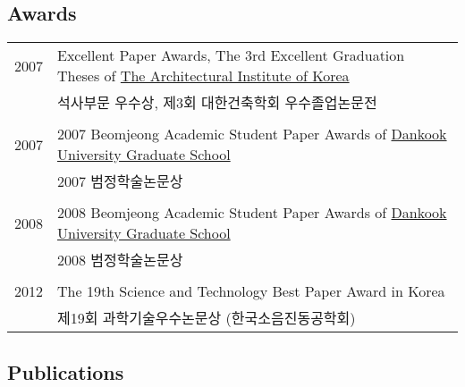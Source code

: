 \subsection*{Awards}

\begin{tabularx}{\textwidth}{p{}X}
    2007 & Excellent Paper Awards, The 3rd Excellent Graduation Theses of \href{http://www.aik.or.kr}{The Architectural Institute of Korea} \\
    & 석사부문 우수상, 제3회 대한건축학회 우수졸업논문전 \\
    \\
    2007 & 2007 Beomjeong Academic Student Paper Awards of \href{http://cms.dankook.ac.kr/web/grad}{Dankook University Graduate School} \\
    & 2007 범정학술논문상 \\
    \\
    2008 & 2008 Beomjeong Academic Student Paper Awards of \href{http://cms.dankook.ac.kr/web/grad}{Dankook University Graduate School} \\
    & 2008 범정학술논문상 \\
    \\
    2012 & The 19th Science and Technology Best Paper Award in Korea\\
    & 제19회 과학기술우수논문상 (한국소음진동공학회)
    \\
\end{tabularx}

\subsection*{Publications}
